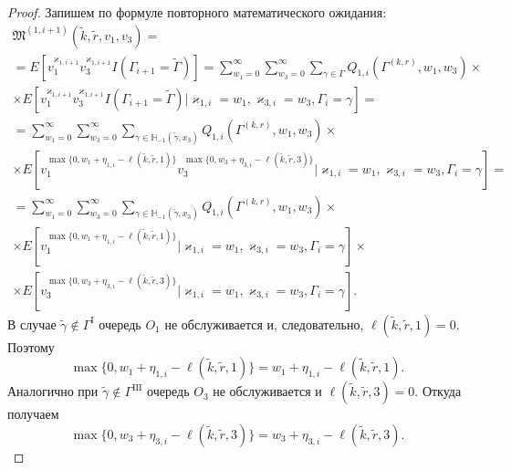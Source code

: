 \begin{proof}
Запишем по формуле повторного математического ожидания:
\begin{multline}
\mathfrak{M}^{(1, i+1)}(\tilde{k}, \tilde{r}, v_1, v_3) =\\
= E[v_1^{\varkappa_{1, i+1}}v_3^{\varkappa_{1, i+1}}I(\Gamma_{i+1}=\tilde{\Gamma})] =
\sum_{w_1=0}^{\infty}\sum_{w_3=0}^{\infty} \sum_{\gamma \in \Gamma} Q_{1, i}(\Gamma^{(k, r)}, w_1, w_3) \times \\
\times
E[v_1^{\varkappa_{1, i+1}}v_3^{\varkappa_{1, i+1}}I(\Gamma_{i+1}=\tilde{\Gamma}) | \varkappa_{1, i}=w_1, \varkappa_{3, i}=w_3,  \Gamma_i=\gamma] = \\ =
\sum_{w_1=0}^{\infty}\sum_{w_3=0}^{\infty} \sum_{\gamma \in {\mathbb H}_{-1}(\tilde{\gamma}, x_3)} Q_{1, i}(\Gamma^{(k, r)}, w_1, w_3) 
\times \\ \times E[v_1^{\max{\{0,  w_1 + \eta_{1, i} - \ell(\tilde{k}, \tilde{r}, 1)\}}} v_3^{\max{\{0,  w_3 + \eta_{3, i} - \ell(\tilde{k}, \tilde{r}, 3)\}}} | \varkappa_{1, i}=w_1, \varkappa_{3, i}=w_3,  \Gamma_i=\gamma] = \\ =
\sum_{w_1=0}^{\infty}\sum_{w_3=0}^{\infty} \sum_{\gamma \in {\mathbb H}_{-1}(\tilde{\gamma}, x_3)} Q_{1, i}(\Gamma^{(k, r)}, w_1, w_3) 
\times \\ \times E[v_1^{\max{\{0,  w_1 + \eta_{1, i} - \ell(\tilde{k}, \tilde{r}, 1)\}}} | \varkappa_{1, i}=w_1, \varkappa_{3, i}=w_3,  \Gamma_i=\gamma] \times \\ \times E[ v_3^{\max{\{0,  w_3 + \eta_{3, i} - \ell(\tilde{k}, \tilde{r}, 3)\}}} | \varkappa_{1, i}=w_1, \varkappa_{3, i}=w_3,  \Gamma_i=\gamma].
\label{second:try:gen}
\end{multline}
В случае $\tilde{\gamma}\not\in \Gamma^{\mathrm{I}}$ очередь $O_1$ не обслуживается и,  следовательно,  $\ell(\tilde{k}, \tilde{r}, 1)=0$. Поэтому
$$
\max{\{0,  w_1 + \eta_{1, i} - \ell(\tilde{k}, \tilde{r}, 1)\}} = w_1 + \eta_{1, i} - \ell(\tilde{k}, \tilde{r}, 1).
$$
Аналогично при $\tilde{\gamma}\not\in \Gamma^{\mathrm{III}}$ очередь $O_3$ не обслуживается и $\ell(\tilde{k}, \tilde{r}, 3)=0$. Откуда получаем 
$$
\max{\{0,  w_3 + \eta_{3, i} - \ell(\tilde{k}, \tilde{r}, 3)\}} = w_3 + \eta_{3, i} - \ell(\tilde{k}, \tilde{r}, 3).
$$


\end{proof}
